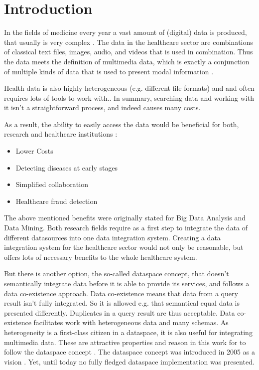 \chapter{Introduction}

In the fields of medicine every year a vast amount of (digital) data is produced, that usually is very complex \cite[p. 1]{ASurveyOnDataMiningApproachesForHealthcare}. 
The data in the healthcare sector are combinations of classical text files, images, audio, and videos that is used in combination. Thus the data meets the definition of multimedia data, which is exactly a conjunction of multiple kinds of data that is used to present modal information \cite[p. 2]{DBLP:journals/corr/abs-1102-5769}.

Health data is also highly heterogeneous (e.g. different file formats) and and often requires lots of tools to work with.\cite[p. 1]{Raghupathi2014}. In summary, searching data and working with it isn't a straightforward process, and indeed causes many costs.

As a result, the ability to easily access the data would be beneficial for both, research and healthcare institutions \cite[p. 2]{Raghupathi2014}:
\begin{itemize}
	\item Lower Costs
	\item Detecting diseases at early stages
	\item Simplified collaboration
	\item Healthcare fraud detection
\end{itemize}


The above mentioned benefits were originally stated for Big Data Analysis and Data Mining. 
Both research fields require as a first step to integrate the data of different datasources into one data integration system. Creating a data integration system for the healthcare sector would not only be reasonable, but offers lots of necessary benefits to the whole healthcare system.

But there is another option, the so-called dataspace concept, that doesn't semantically integrate data before it is able to provide its services, and follows a data co-existence approach. Data co-existence means that data from a query result isn't fully integrated. So it is allowed e.g. that semantical equal data is presented differently. Duplicates  in a query result are thus acceptable.
Data co-existence facilitates work with heterogeneous data and many schemas. As heterogeneity is a first-class citizen in a dataspace, it is also useful for integrating multimedia data. 
These are attractive properties and reason in this work for to follow the dataspace concept . The dataspace concept was introduced in 2005 as a vision \cite{Franklin:2005:DDN:1107499.1107502}. Yet, until today no fully fledged dataspace implementation was presented.

